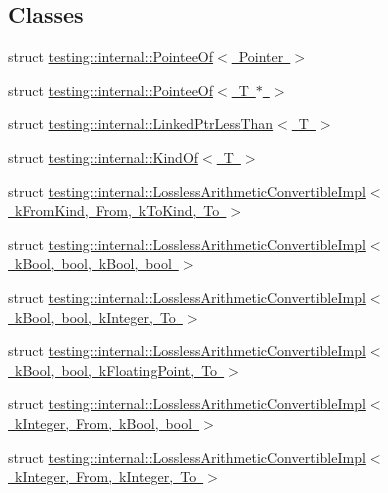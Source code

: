 \subsection*{Classes}
\begin{DoxyCompactItemize}
\item 
struct \mbox{\hyperlink{structtesting_1_1internal_1_1PointeeOf}{testing\+::internal\+::\+Pointee\+Of$<$ Pointer $>$}}
\item 
struct \mbox{\hyperlink{structtesting_1_1internal_1_1PointeeOf_3_01T_01_5_01_4}{testing\+::internal\+::\+Pointee\+Of$<$ T $\ast$ $>$}}
\item 
struct \mbox{\hyperlink{structtesting_1_1internal_1_1LinkedPtrLessThan}{testing\+::internal\+::\+Linked\+Ptr\+Less\+Than$<$ T $>$}}
\item 
struct \mbox{\hyperlink{structtesting_1_1internal_1_1KindOf}{testing\+::internal\+::\+Kind\+Of$<$ T $>$}}
\item 
struct \mbox{\hyperlink{structtesting_1_1internal_1_1LosslessArithmeticConvertibleImpl}{testing\+::internal\+::\+Lossless\+Arithmetic\+Convertible\+Impl$<$ k\+From\+Kind, From, k\+To\+Kind, To $>$}}
\item 
struct \mbox{\hyperlink{structtesting_1_1internal_1_1LosslessArithmeticConvertibleImpl_3_01kBool_00_01bool_00_01kBool_00_01bool_01_4}{testing\+::internal\+::\+Lossless\+Arithmetic\+Convertible\+Impl$<$ k\+Bool, bool, k\+Bool, bool $>$}}
\item 
struct \mbox{\hyperlink{structtesting_1_1internal_1_1LosslessArithmeticConvertibleImpl_3_01kBool_00_01bool_00_01kInteger_00_01To_01_4}{testing\+::internal\+::\+Lossless\+Arithmetic\+Convertible\+Impl$<$ k\+Bool, bool, k\+Integer, To $>$}}
\item 
struct \mbox{\hyperlink{structtesting_1_1internal_1_1LosslessArithmeticConvertibleImpl_3_01kBool_00_01bool_00_01kFloatingPoint_00_01To_01_4}{testing\+::internal\+::\+Lossless\+Arithmetic\+Convertible\+Impl$<$ k\+Bool, bool, k\+Floating\+Point, To $>$}}
\item 
struct \mbox{\hyperlink{structtesting_1_1internal_1_1LosslessArithmeticConvertibleImpl_3_01kInteger_00_01From_00_01kBool_00_01bool_01_4}{testing\+::internal\+::\+Lossless\+Arithmetic\+Convertible\+Impl$<$ k\+Integer, From, k\+Bool, bool $>$}}
\item 
struct \mbox{\hyperlink{structtesting_1_1internal_1_1LosslessArithmeticConvertibleImpl_3_01kInteger_00_01From_00_01kInteger_00_01To_01_4}{testing\+::internal\+::\+Lossless\+Arithmetic\+Convertible\+Impl$<$ k\+Integer, From, k\+Integer, To $>$}}

\end{DoxyCompactItemize}
